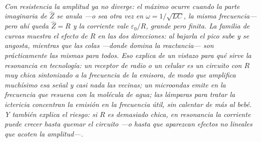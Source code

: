 \begin{center}
\\[0.5em]
{\small\itshape Con resistencia la amplitud ya no diverge: el máximo ocurre
cuando la parte imaginaria de $\hat Z$ se anula ---o sea otra vez en
$\omega = 1/\sqrt{LC}$, la misma frecuencia--- pero ahí queda
$\hat Z = R$ y la corriente vale $\varepsilon_0/R$, grande pero finita. La
familia de curvas muestra el efecto de $R$ en las dos direcciones: al bajarla el
pico sube \emph{y} se angosta, mientras que las colas ---donde domina la
reactancia--- son prácticamente las mismas para todos. Eso explica de un vistazo
para qué sirve la resonancia en tecnología: un receptor de radio o un celular es
un circuito con $R$ muy chica sintonizado a la frecuencia de la emisora, de modo
que amplifica muchísimo esa señal y casi nada las vecinas; un microondas emite
en la frecuencia que resuena con la molécula de agua; las lámparas para tratar
la ictericia concentran la emisión en la frecuencia útil, sin calentar de más al
bebé. Y también explica el riesgo: si $R$ es demasiado chica, en resonancia la
corriente puede crecer hasta quemar el circuito ---o hasta que aparezcan efectos
no lineales que acoten la amplitud---.}
\end{center}
